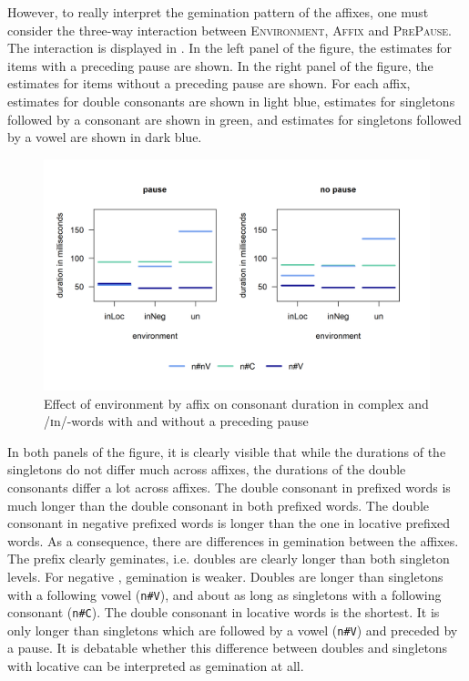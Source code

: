  However, to really interpret the gemination pattern of the affixes, one must consider the three-way interaction between \textsc{Environment}, \textsc{Affix} and \textsc{PrePause}. The interaction is displayed in . In the left panel of the figure, the estimates for items with a preceding pause are shown. In the right panel of the figure, the estimates for items without a preceding pause are shown. For each affix, estimates for double consonants are shown in light blue, estimates for singletons followed by a consonant are shown in green, and estimates for singletons followed by a vowel are shown in dark blue.






\begin{figure} [h!]
	\centering
	\includegraphics [scale=0.6] {images/Experiment/UnInInterEnvAffixPause1}
	\vspace*{-0.4cm}
	\caption{Effect of environment by affix on consonant duration in complex  and /ɪn/-words with and without a preceding pause}
	\label{fig:Un In experiment}
\end{figure}


In both panels of the figure, it is clearly visible that while the durations of the singletons do not differ much across affixes, the durations of the double consonants differ a lot across affixes. The double consonant in prefixed words is much longer than the double consonant in both prefixed words.
The double consonant in negative prefixed words is longer than the one in locative prefixed words. 
As a consequence, there are differences in gemination between the affixes. 
 The prefix  clearly geminates, i.e. doubles are clearly longer than both singleton levels. 
For negative , gemination is weaker. Doubles are longer than singletons with a following vowel (\texttt{n\#V}), and about as long as singletons with a following consonant (\texttt{n\#C}). 
The double consonant in locative words is the shortest. It is only longer than singletons which are followed by a vowel (\texttt{n\#V}) and preceded by a pause. It is debatable whether this difference between doubles and singletons with locative  can be interpreted as gemination at all.

